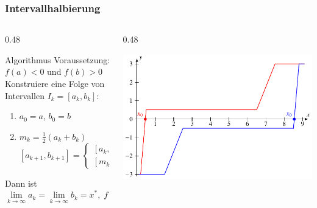 %
%
%
\begin{frame}
\frametitle{Intervallhalbierung}
\begin{columns}[t]
\begin{column}{0.48\hsize}
\begin{block}{Algorithmus}
Voraussetzung: $f(a)<0$ und $f(b)>0$
\\
Konstruiere eine Folge von Intervallen $I_k=[a_k,b_k]$:
\begin{enumerate}
\item $a_0=a$, $b_0=b$
\item 
$m_k = \frac12(a_k+b_k)$
\[
[a_{k+1},b_{k+1}]
=
\begin{cases}
[a_k,m_k]&\; f(m_k) > 0\\
[m_k,b_k]&\; f(m_k) < 0
\end{cases}
\]
\end{enumerate}
Dann ist
\[
\lim_{k\to\infty} a_k
=
\lim_{k\to\infty} b_k
=
x^*,\;
f(x^*)=0
\]
\end{block}
\end{column}
\begin{column}{0.48\hsize}
\begin{center}
\includegraphics[width=\hsize]{../../buch/chapters/20-gleichungen/figures/stufe.pdf}
\end{center}
\end{column}
\end{columns}
\end{frame}
